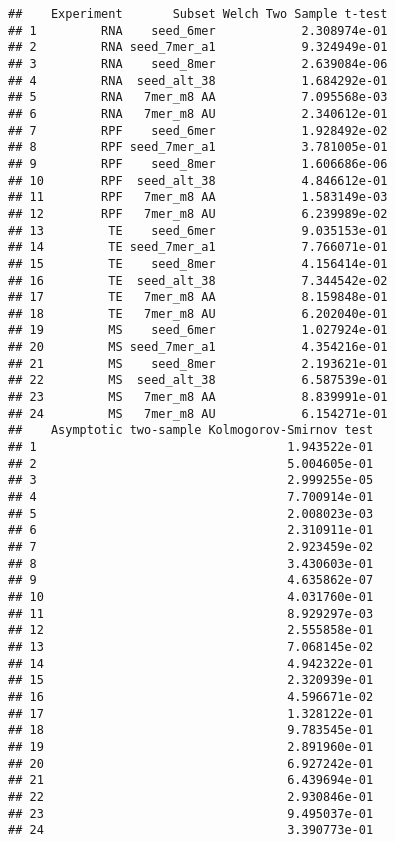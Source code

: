\documentclass[
]{article}
\begin{document}
\begin{verbatim}
##    Experiment       Subset Welch Two Sample t-test
## 1         RNA    seed_6mer            2.308974e-01
## 2         RNA seed_7mer_a1            9.324949e-01
## 3         RNA    seed_8mer            2.639084e-06
## 4         RNA  seed_alt_38            1.684292e-01
## 5         RNA   7mer_m8 AA            7.095568e-03
## 6         RNA   7mer_m8 AU            2.340612e-01
## 7         RPF    seed_6mer            1.928492e-02
## 8         RPF seed_7mer_a1            3.781005e-01
## 9         RPF    seed_8mer            1.606686e-06
## 10        RPF  seed_alt_38            4.846612e-01
## 11        RPF   7mer_m8 AA            1.583149e-03
## 12        RPF   7mer_m8 AU            6.239989e-02
## 13         TE    seed_6mer            9.035153e-01
## 14         TE seed_7mer_a1            7.766071e-01
## 15         TE    seed_8mer            4.156414e-01
## 16         TE  seed_alt_38            7.344542e-02
## 17         TE   7mer_m8 AA            8.159848e-01
## 18         TE   7mer_m8 AU            6.202040e-01
## 19         MS    seed_6mer            1.027924e-01
## 20         MS seed_7mer_a1            4.354216e-01
## 21         MS    seed_8mer            2.193621e-01
## 22         MS  seed_alt_38            6.587539e-01
## 23         MS   7mer_m8 AA            8.839991e-01
## 24         MS   7mer_m8 AU            6.154271e-01
##    Asymptotic two-sample Kolmogorov-Smirnov test
## 1                                   1.943522e-01
## 2                                   5.004605e-01
## 3                                   2.999255e-05
## 4                                   7.700914e-01
## 5                                   2.008023e-03
## 6                                   2.310911e-01
## 7                                   2.923459e-02
## 8                                   3.430603e-01
## 9                                   4.635862e-07
## 10                                  4.031760e-01
## 11                                  8.929297e-03
## 12                                  2.555858e-01
## 13                                  7.068145e-02
## 14                                  4.942322e-01
## 15                                  2.320939e-01
## 16                                  4.596671e-02
## 17                                  1.328122e-01
## 18                                  9.783545e-01
## 19                                  2.891960e-01
## 20                                  6.927242e-01
## 21                                  6.439694e-01
## 22                                  2.930846e-01
## 23                                  9.495037e-01
## 24                                  3.390773e-01
\end{verbatim}
\end{document}
